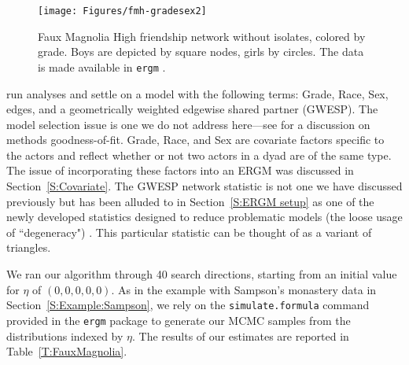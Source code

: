 \begin{figure}[!h]
\centering
\texttt{[image: Figures/fmh-gradesex2]}
\caption[Faux Magnolia High friendship network without isolates, colored by grade]
{Faux Magnolia High friendship network without isolates, colored by grade.  Boys
are depicted by square nodes, girls by circles.  The data is made available in \texttt{ergm} \citep{ergm:R}.}
\label{F:fmh}
\end{figure}

\citet{statnet-tutorial} run analyses and settle on a model with the following terms: 
Grade, Race, Sex, edges, and a geometrically weighted edgewise shared partner (GWESP). The model selection issue is one we do not address here---see \citep{GOF}
 for a discussion on methods goodness-of-fit.  
Grade, Race, and Sex are covariate factors specific to the 
actors and reflect whether or not two actors in a dyad are of the same type.  
The issue of incorporating these factors into an ERGM was 
discussed in Section~\ref{S:Covariate}.  The GWESP network statistic is not one we
have discussed previously but has been alluded to in Section~\ref{S:ERGM setup} as
one of the newly developed statistics designed to reduce problematic models
(the loose usage of ``degeneracy") 
\citep{Handcock:2006, Hunter:2006, recentp*}.  This particular statistic can be 
thought of as a variant of triangles.

We ran our algorithm through 40 search directions, starting from an initial value for 
$\eta$ of $(0, 0, 0, 0, 0)$.  As in the example with Sampson's monastery data
in Section~\ref{S:Example:Sampson}, we rely
on the \texttt{simulate.formula} command provided in the \texttt{ergm} package to
generate our MCMC samples from the distributions indexed by $\eta$.  The results of our 
estimates are reported in Table~\ref{T:FauxMagnolia}.
%
%
%

